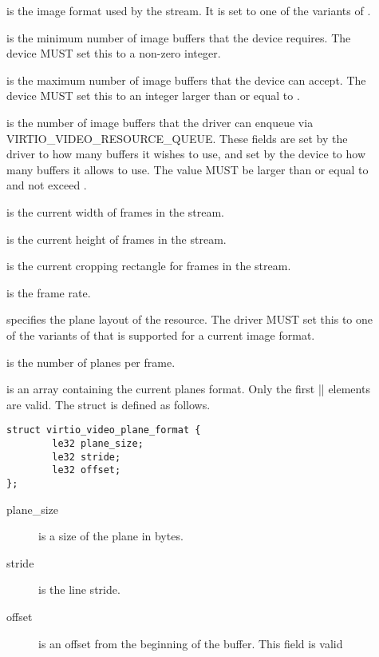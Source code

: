 \begin{description}
\begin{description}
\item[] is the image format used by the stream. It is
  set to one of the variants of .
\item[] is the minimum number of image buffers that the
  device requires. The device MUST set this to a non-zero integer.
\item[] is the maximum number of image buffers that the
  device can accept. The device MUST set this to an integer larger than
  or equal to .
\item[] is the number of image buffers that the driver
  can enqueue via VIRTIO_VIDEO_RESOURCE_QUEUE. These fields are set by the
  driver to how many buffers it wishes to use, and set by the device
  to how many buffers it allows to use.
  The value MUST be larger than or equal to  and not
  exceed .
\item[] is the current width of frames in the stream.
\item[] is the current height of frames in the stream.
\item[] is the current cropping rectangle for frames in the stream.
\item[] is the frame rate.
\item[] specifies the plane layout of the resource. The
  driver MUST set this to one of the variants of  that is supported for a current image format.
\item[] is the number of planes per frame.
\item[] is an array containing the current planes format.
  Only the first || elements are valid. The struct
   is defined as follows.
\begin{lstlisting}
struct virtio_video_plane_format {
        le32 plane_size;
        le32 stride;
        le32 offset;
};
\end{lstlisting}
\begin{description}
\item[plane_size] is a size of the plane in bytes.
\item[stride] is the line stride.
\item[offset] is an offset from the beginning of the buffer. This field is valid

\end{description}
\end{description}
\end{description}

